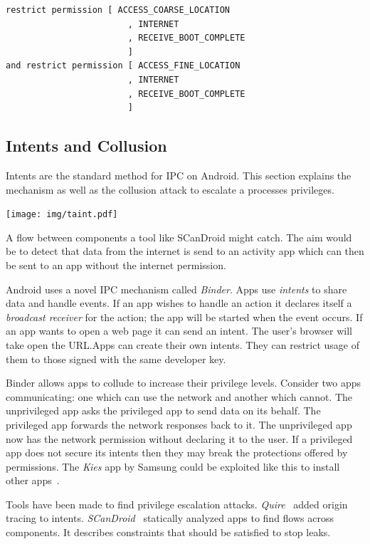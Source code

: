 \documentclass[a4paper,sfsidenotes]{%
  article%
}
\begin{document}
\begin{lstlisting}[language=Kirin]
    restrict permission [ ACCESS_COARSE_LOCATION
                        , INTERNET
                        , RECEIVE_BOOT_COMPLETE
                        ]
and restrict permission [ ACCESS_FINE_LOCATION
                        , INTERNET
                        , RECEIVE_BOOT_COMPLETE
                        ]
\end{lstlisting}

\subsection{Intents and Collusion}\label{sec:intents}

Intents are the standard method for IPC on Android.  This section explains the
mechanism as well as the collusion attack to escalate a processes privileges.

\begin{marginfigure}
  \centering
  \texttt{[image: img/taint.pdf]}
  \caption{A flow between components a tool like SCanDroid might
  catch. The aim would be to detect that data from the internet is send to an
activity app which can then be sent to an app without the internet permission.}
  \label{fig:taint}
\end{marginfigure}

Android uses a novel IPC mechanism called \emph{Binder}. Apps use \emph{intents}
to share data and handle events. If an app wishes to handle an
 action it declares itself a \emph{broadcast receiver} for
the action; the app will be started when the event occurs.  If an app wants to
open a web page it can send an  intent. The user's browser
will take open the URL.\@ Apps can create their own intents. They can restrict
usage of them to those signed with the same developer key.

Binder allows apps to collude to increase their privilege levels.  Consider two
apps communicating: one which can use the network and another which cannot.  The
unprivileged app asks the privileged app to send data on its behalf. The
privileged app forwards the network responses back to it. The unprivileged app
now has the network permission without declaring it to the user.  If a
privileged app does not secure its intents then they may break the protections
offered by permissions. The \emph{Kies} app by Samsung could be exploited like
this to install other apps~\cite{moulu:8btkPowj}.

Tools have been made to find privilege escalation attacks.
\emph{Quire}~\cite{Bugiel:2012ui} added origin tracing to intents.
\emph{SCanDroid}~\cite{Fuchs:2009vi} statically analyzed apps to find flows
across components. It describes constraints that should be satisfied to stop
leaks. 
\end{document}
